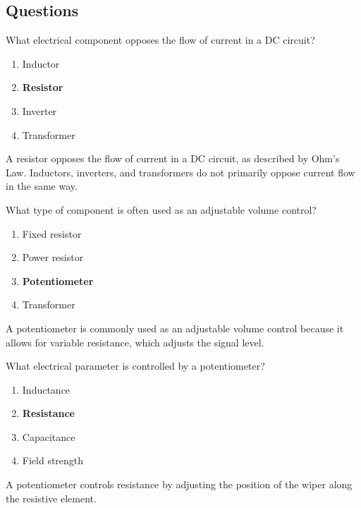\subsection*{Questions}
\begin{tcolorbox}[colback=gray!10!white,colframe=black!75!black,title={T6A01}]
    What electrical component opposes the flow of current in a DC circuit?
    \begin{enumerate}[label=\Alph*,noitemsep]
        \item Inductor
        \item \textbf{Resistor}
        \item Inverter
        \item Transformer
    \end{enumerate}
\end{tcolorbox}
A resistor opposes the flow of current in a DC circuit, as described by Ohm's Law. Inductors, inverters, and transformers do not primarily oppose current flow in the same way.


\begin{tcolorbox}[colback=gray!10!white,colframe=black!75!black,title={T6A02}]
    What type of component is often used as an adjustable volume control?
    \begin{enumerate}[label=\Alph*,noitemsep]
        \item Fixed resistor
        \item Power resistor
        \item \textbf{Potentiometer}
        \item Transformer
    \end{enumerate}
\end{tcolorbox}
A potentiometer is commonly used as an adjustable volume control because it allows for variable resistance, which adjusts the signal level.


\begin{tcolorbox}[colback=gray!10!white,colframe=black!75!black,title={T6A03}]
    What electrical parameter is controlled by a potentiometer?
    \begin{enumerate}[label=\Alph*,noitemsep]
        \item Inductance
        \item \textbf{Resistance}
        \item Capacitance
        \item Field strength
    \end{enumerate}
\end{tcolorbox}
A potentiometer controls resistance by adjusting the position of the wiper along the resistive element.

